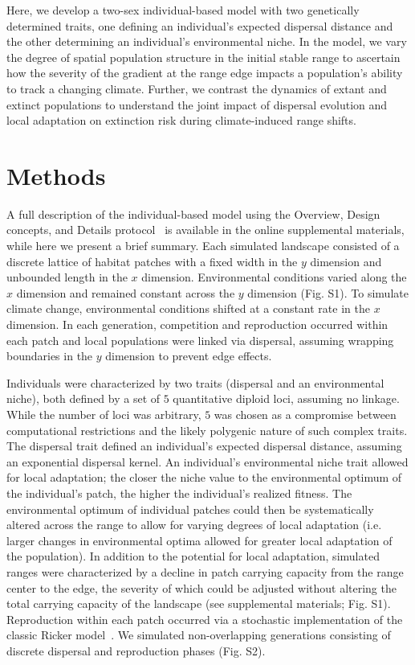 \documentclass[12pt, oneside]{article}
\begin{document}
Here, we develop a two-sex individual-based model with two genetically determined traits, one defining an individual's expected dispersal distance and the other determining an individual's environmental niche. In the model, we vary the degree of spatial population structure in the initial stable range to ascertain how the severity of the gradient at the range edge impacts a population's ability to track a changing climate. Further, we contrast the dynamics of extant and extinct populations to understand the joint impact of dispersal evolution and local adaptation on extinction risk during climate-induced range shifts.

\section*{Methods}
A full description of the individual-based model using the Overview, Design concepts, and Details protocol~\citep{grimm2010odd} is available in the online supplemental materials, while here we present a brief summary. Each simulated landscape consisted of a discrete lattice of habitat patches with a fixed width in the $y$ dimension and unbounded length in the $x$ dimension. Environmental conditions varied along the $x$ dimension and remained constant across the $y$ dimension (Fig. S1). To simulate climate change, environmental conditions shifted at a constant rate in the $x$ dimension. In each generation, competition and reproduction occurred within each patch and local populations were linked via dispersal, assuming wrapping boundaries in the $y$ dimension to prevent edge effects. 

Individuals were characterized by two traits (dispersal and an environmental niche), both defined by a set of $5$ quantitative diploid loci, assuming no linkage. While the number of loci was arbitrary, $5$ was chosen as a compromise between computational restrictions and the likely polygenic nature of such complex traits. The dispersal trait defined an individual's expected dispersal distance, assuming an exponential dispersal kernel. An individual's environmental niche trait allowed for local adaptation; the closer the niche value to the environmental optimum of the individual's patch, the higher the individual's realized fitness. The environmental optimum of individual patches could then be systematically altered across the range to allow for varying degrees of local adaptation (i.e. larger changes in environmental optima allowed for greater local adaptation of the population). In addition to the potential for local adaptation, simulated ranges were characterized by a decline in patch carrying capacity from the range center to the edge, the severity of which could be adjusted without altering the total carrying capacity of the landscape (see supplemental materials; Fig. S1). Reproduction within each patch occurred via a stochastic implementation of the classic Ricker model~\citep{ricker1954stock, melbourne2008extinction}. We simulated non-overlapping generations consisting of discrete dispersal and reproduction phases (Fig. S2).
\end{document}
